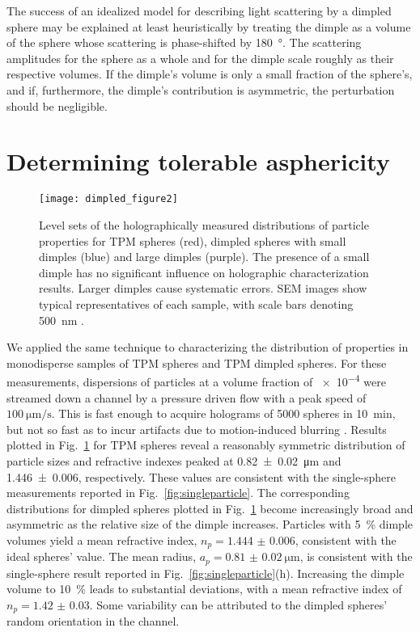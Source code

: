 The success of an idealized model for describing light scattering by a
dimpled sphere may be explained at least heuristically by treating
the dimple as a volume of the sphere whose scattering is phase-shifted
by \SI{180}{\degree}.
The scattering amplitudes for the sphere as a whole and for the dimple
scale roughly as their respective volumes.
If the dimple's volume is only a small fraction of the
sphere's, and if, furthermore, the dimple's contribution is asymmetric,
the perturbation should be negligible.


\section{Determining tolerable asphericity}


\begin{figure}[!t]
  \centering
  \texttt{[image: dimpled\_figure2]}
  \caption{Level sets of the holographically measured 
    distributions of particle properties for TPM spheres
    (red), dimpled spheres with small dimples (blue) and
    large dimples (purple).  The presence of a small dimple
    has no significant influence on holographic characterization
    results.  Larger dimples cause systematic errors.
    SEM images show typical representatives of each sample,
    with scale bars denoting \SI{500}{\nm} \cite{hannel15}.}
  \label{fig:distributions}
\end{figure}

We applied the same technique to characterizing the distribution
of properties in monodisperse samples of TPM spheres and 
TPM dimpled spheres.
For these measurements, dispersions of particles at a volume fraction
of \num{e-4} were streamed down a channel by a pressure driven flow
with a peak speed of $\SI{100}{\um\per\second}$.  This is fast enough
to acquire holograms of \num{5000} spheres in \SI{10}{\minute}, but
not so fast as to incur artifacts due to motion-induced blurring
\cite{cheong09,dixon11}.
Results plotted in Fig.~\ref{fig:distributions} for TPM spheres reveal
a reasonably symmetric distribution of particle sizes and refractive
indexes peaked at \SI{0.82(2)}{\um} and \num{1.446(6)}, respectively.
These values are consistent with the single-sphere measurements
reported in Fig.~\ref{fig:singleparticle}.
The corresponding distributions for dimpled spheres plotted in
Fig.~\ref{fig:distributions} become increasingly broad and asymmetric
as the relative size of the dimple increases.
Particles with \SI{5}{\percent} dimple volumes yield a mean refractive
index, $n_p=\num{1.444(6)}$, consistent with the ideal spheres' value.
The mean radius, $a_p=\SI{0.81(2)}{\um}$, is consistent with the
  single-sphere result reported in Fig.~\ref{fig:singleparticle}(h).
Increasing the dimple volume to \SI{10}{\percent} leads to
substantial deviations, with a mean refractive index of
$n_p=\num{1.42(3)}$.
Some variability can be attributed to the dimpled spheres'
random orientation in the channel.

